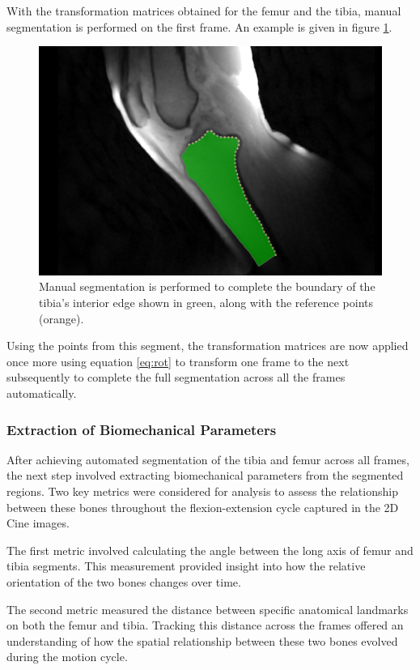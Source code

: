 \documentclass{micro-econ-thesis}
\begin{document}
With the transformation matrices obtained for the femur and the tibia, manual segmentation is performed on the first frame. An example is given in figure \ref{fig:manualsegment}. 
\begin{figure} [H]
	\centering
	\includegraphics[width=0.7\linewidth]{manual_segment}
	\caption{Manual segmentation is performed to complete the boundary of the tibia's interior edge shown in green, along with the reference points (orange).}
	\label{fig:manualsegment}
\end{figure}

Using the points from this segment, the transformation matrices are now applied once more using equation \ref{eq:rot} to transform one frame to the next subsequently to complete the full segmentation across all the frames automatically. 

\subsubsection{Extraction of Biomechanical Parameters}
After achieving automated segmentation of the tibia and femur across all frames, the next step involved extracting biomechanical parameters from the segmented regions. Two key metrics were considered for analysis to assess the relationship between these bones throughout the flexion-extension cycle captured in the 2D Cine images.

The first metric involved calculating the angle between the long axis of femur and tibia segments. This measurement provided insight into how the relative orientation of the two bones changes over time.

The second metric measured the distance between specific anatomical landmarks on both the femur and tibia. Tracking this distance across the frames offered an understanding of how the spatial relationship between these two bones evolved during the motion cycle. 
\end{document}
